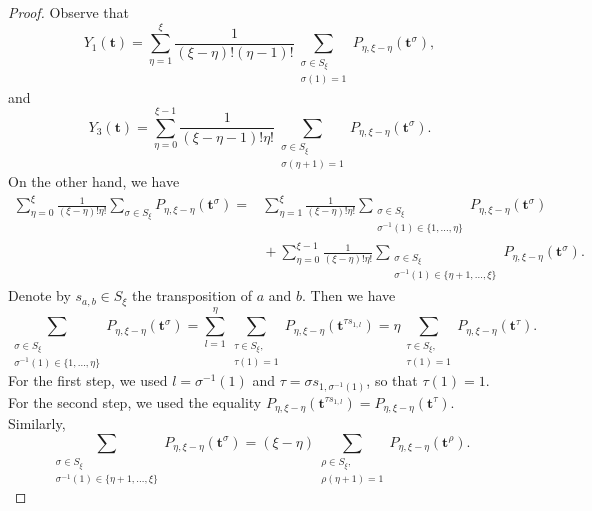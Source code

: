 \documentclass[pdftex]{sigma}
\numberwithin{equation}{section}
\begin{document}
\begin{proof}
Observe that
\begin{equation*}
Y_1(\boldsymbol{t})= \sum_{\eta=1}^\xi \frac{1}{(\xi-\eta) ! (\eta-1)!} \sum_{\substack{\sigma\in S_\xi\\\sigma (1)=1}} P_{\eta,\xi-\eta}(\boldsymbol{t}^\sigma),
\end{equation*}
and
\begin{equation*}
Y_3(\boldsymbol{t})= \sum_{\eta=0}^{\xi-1} \frac{1}{(\xi-\eta-1) ! \eta !} \sum_{\substack{\sigma\in S_\xi\\\sigma (\eta+1)=1}}P_{\eta,\xi-\eta}(\boldsymbol{t}^\sigma).
\end{equation*}
On the other hand, we have
\begin{align*}
\sum_{\eta=0}^\xi \frac{1}{(\xi-\eta)!\eta!}\sum_{\sigma\in S_\xi} P_{\eta,\xi-\eta}(\boldsymbol{t}^\sigma)={}&\sum_{\eta=1}^\xi \frac{1}{(\xi-\eta)!\eta!} \sum_{\substack{\sigma\in S_\xi\\\sigma^{-1}(1)\in\{1,\dots,\eta\}}} P_{\eta,\xi-\eta}(\boldsymbol{t}^\sigma)\\
&{}{+} \sum_{\eta=0}^{\xi-1} \frac{1}{(\xi-\eta)!\eta!}\sum_{\substack{\sigma\in S_\xi\\\sigma^{-1}(1)\in\{\eta+1,\dots,\xi\}}}P_{\eta,\xi-\eta}(\boldsymbol{t}^\sigma).
\end{align*}
Denote by $s_{a,b}\in S_\xi$ the transposition of $a$ and $b$. Then we have
\begin{equation*}
\sum_{\substack{\sigma\in S_\xi\\\sigma^{-1}(1)\in\{1,\dots,\eta\}}} P_{\eta,\xi-\eta}(\boldsymbol{t}^\sigma) =\sum_{l=1}^\eta \sum_{\substack{\tau\in S_\xi,\\ \tau(1)=1}} P_{\eta,\xi-\eta}(\boldsymbol{t}^{\tau s_{1,l}})= \eta \sum_{\substack{\tau\in S_\xi,\\ \tau(1)=1}} P_{\eta,\xi-\eta}(\boldsymbol{t}^\tau).
\end{equation*}
For the first step, we used $l=\sigma^{-1}(1)$ and $\tau=\sigma s_{1,\sigma^{-1}(1)}$, so that $\tau(1)=1$. For the second step, we used the equality $P_{\eta,\xi-\eta}(\boldsymbol{t}^{\tau s_{1,l}})=P_{\eta,\xi-\eta}(\boldsymbol{t}^\tau)$.
Similarly,
\begin{equation*}
\sum_{\substack{\sigma\in S_\xi\\\sigma^{-1}(1)\in\{\eta+1,\dots,\xi\}}}P_{\eta,\xi-\eta}(\boldsymbol{t}^\sigma)=(\xi-\eta) \sum_{\substack{\rho\in S_\xi,\\ \rho(\eta+1)=1}} P_{\eta,\xi-\eta}(\boldsymbol{t}^\rho).
\end{equation*}

\end{proof}
\end{document}
